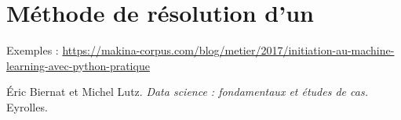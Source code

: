 \section{Méthode de résolution d'un }



Exemples : 
\url{https://makina-corpus.com/blog/metier/2017/initiation-au-machine-learning-avec-python-pratique}

\begin{thebibliography}{2}
    Éric Biernat et Michel Lutz. {\it Data science : fondamentaux et études de cas.} Eyrolles.
\end{thebibliography}

